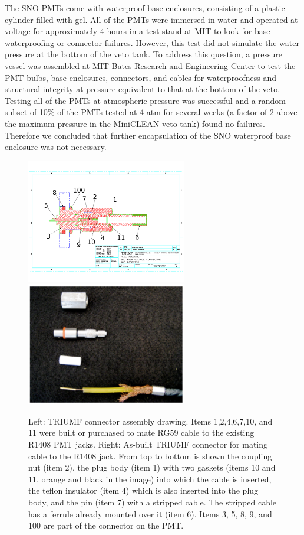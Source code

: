 \documentclass[pdftex]{JINST}
\begin{document}
The SNO PMTs come with waterproof base enclosures, consisting of a
plastic cylinder filled with gel. All of the PMTs were immersed in water and operated at voltage for approximately 4 hours in a test stand at
MIT to look for base waterproofing or connector failures. However,
this test did not simulate the water pressure at the bottom of the
veto tank. To address this question, a pressure vessel was assembled
at MIT Bates Research and Engineering Center to test the PMT bulbs, base enclosures, connectors, and
cables for waterproofness and structural integrity at pressure
equivalent to that at the bottom of the veto. Testing
all of the PMTs at atmospheric pressure was successful and a random
subset of 10\% of the PMTs tested at 4 atm for several weeks (a factor of 2
above the maximum pressure in the MiniCLEAN veto tank) found no
failures. Therefore we concluded that further encapsulation of the
SNO waterproof base enclosure was not necessary.

\begin{figure}[ht]
\begin{center}
\includegraphics[width=2.75in]{graphics/snoConnectorDrawings.pdf}
\includegraphics[width=2.75in]{graphics/connectorpic.pdf}
\caption{Left: TRIUMF connector assembly drawing. Items 1,2,4,6,7,10, and 11 were built or purchased to mate RG59 cable to the existing R1408 PMT jacks. Right: As-built TRIUMF connector for mating cable to the R1408 jack. From top to bottom is shown the coupling nut (item 2), the plug body (item 1) with two gaskets (items 10 and 11, orange and black in the image) into which the cable is inserted, the teflon insulator (item 4) which is also inserted into the plug body, and the pin (item 7) with a stripped cable.  The stripped cable has a ferrule already mounted over it (item 6).  Items 3, 5, 8, 9, and 100 are part of the connector on the PMT.
\label{fig:connectordrawing}}
\end{center}
\end{figure}
\end{document}
